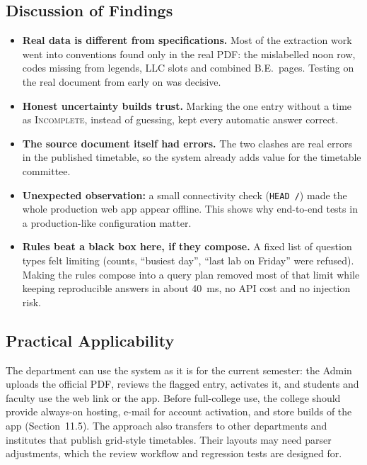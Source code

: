 \subsection{Discussion of Findings}
\begin{itemize}
\item \textbf{Real data is different from specifications.} Most of the extraction work went into
      conventions found only in the real PDF: the mislabelled noon row, codes missing from legends, LLC
      slots and combined B.E.\ pages. Testing on the real document from early on was decisive.
\item \textbf{Honest uncertainty builds trust.} Marking the one entry without a time as
      \textsc{Incomplete}, instead of guessing, kept every automatic answer correct.
\item \textbf{The source document itself had errors.} The two clashes are real errors in the
      published timetable, so the system already adds value for the timetable committee.
\item \textbf{Unexpected observation:} a small connectivity check (\texttt{HEAD /}) made the whole
      production web app appear offline. This shows why end-to-end tests in a production-like
      configuration matter.
\item \textbf{Rules beat a black box here, if they compose.} A fixed list of question types felt limiting
      (counts, ``busiest day'', ``last lab on Friday'' were refused). Making the rules compose into a query
      plan removed most of that limit while keeping reproducible answers in about 40~ms, no API cost and
      no injection risk.
\end{itemize}

\subsection{Practical Applicability}
The department can use the system as it is for the current semester: the Admin uploads the
official PDF, reviews the flagged entry, activates it, and students and faculty use the web link
or the app. Before full-college use, the college should provide always-on hosting, e-mail for account
activation, and store builds of the app (Section~11.5). The approach also transfers to other
departments and institutes that publish grid-style timetables. Their layouts may need parser
adjustments, which the review workflow and regression tests are designed for.

\newpage
